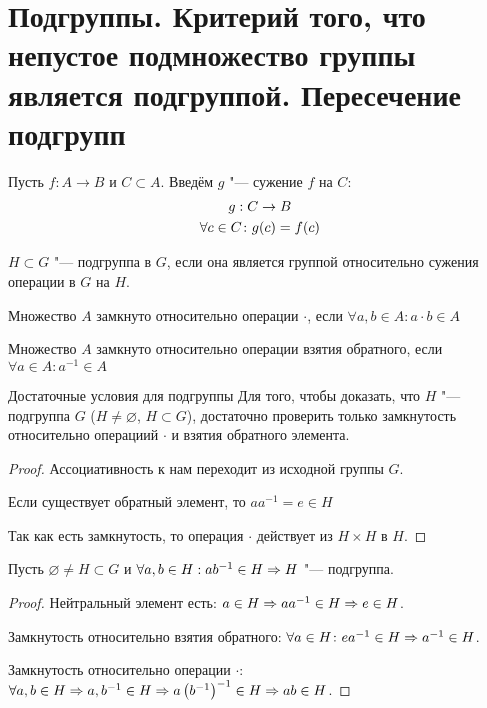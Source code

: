\section{Подгруппы. Критерий того, что непустое подмножество группы является подгруппой. Пересечение подгрупп}
\begin{Def}
	Пусть $f: A \to B$ и $C \subset A$. Введём $g$ "--- сужение $f$ на $C$:
	\begin{gather*}
	g: C \rightarrow B \\
	\forall c \in C\colon g(c) = f(c)
	\end{gather*}
\end{Def}

\begin{Def}
	$H \subset G$ "--- подгруппа в $G$, если она является группой относительно сужения операции в $G$ на $H$.
\end{Def}


\begin{Def}
	Множество $A$ замкнуто относительно операции $\cdot$, если $\forall a, b \in A \colon a \cdot b \in A$

	Множество $A$ замкнуто относительно операции взятия обратного, если $\forall a \in A \colon a^{-1} \in A$ \\
\end{Def}

\begin{theorem}{Достаточные условия для подгруппы}
Для того, чтобы доказать, что $H$ "--- подгруппа $G$ ($H \neq \varnothing$, $H \subset G$), достаточно проверить только замкнутость относительно операциий $\cdot$ и взятия обратного элемента. \\
\end{theorem}
\begin{proof}
Ассоциативность к нам переходит из исходной группы $G$.

Если существует обратный элемент, то $a a^{-1} = e \in H$

Так как есть замкнутость, то операция $\cdot$ действует из $H \times H$ в $H$.
\end{proof}

\begin{conseq}
Пусть $\varnothing \ne H \subset G$ и $\forall a, b \in H: ab^{-1} \in H \Rightarrow H$ "--- подгруппа.  
\end{conseq}
\begin{proof}
Нейтральный элемент есть: $a \in H \Rightarrow aa^{-1} \in H \Rightarrow e \in H$.

Замкнутость относительно взятия обратного: $\forall a \in H \colon ea^{-1} \in H \Rightarrow a^{-1} \in H$.

Замкнутость относительно операции $\cdot$: $\forall a, b \in H \Rightarrow a, b^{-1} \in H \Rightarrow a\left(b^{-1}\right)^{-1} \in H \Rightarrow ab \in H$.
\end{proof}

